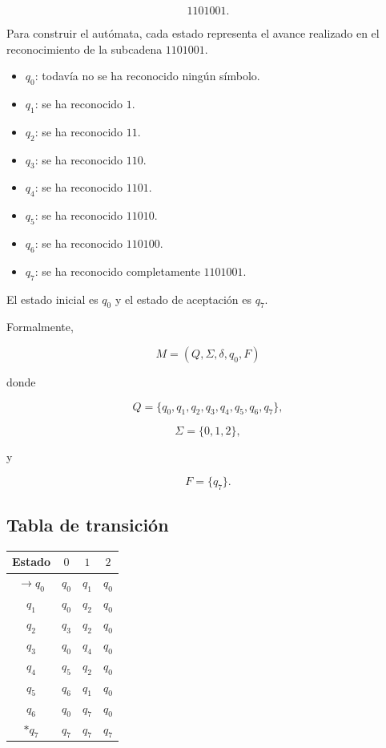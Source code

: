 \documentclass[12pt]{article}
\begin{document}
\[
1101001.
\]

Para construir el autómata, cada estado representa el avance realizado
en el reconocimiento de la subcadena $1101001$.

\begin{itemize}
    \item $q_0$: todavía no se ha reconocido ningún símbolo.
    \item $q_1$: se ha reconocido $1$.
    \item $q_2$: se ha reconocido $11$.
    \item $q_3$: se ha reconocido $110$.
    \item $q_4$: se ha reconocido $1101$.
    \item $q_5$: se ha reconocido $11010$.
    \item $q_6$: se ha reconocido $110100$.
    \item $q_7$: se ha reconocido completamente $1101001$.
\end{itemize}

El estado inicial es $q_0$ y el estado de aceptación es $q_7$.

Formalmente,

\[
M=(Q,\Sigma,\delta,q_0,F)
\]

donde

\[
Q=\{q_0,q_1,q_2,q_3,q_4,q_5,q_6,q_7\},
\]

\[
\Sigma=\{0,1,2\},
\]

y

\[
F=\{q_7\}.
\]

\subsection*{Tabla de transición}

\begin{center}
\begin{tabular}{c|ccc}
Estado & $0$ & $1$ & $2$ \\ \hline
$\rightarrow q_0$ & $q_0$ & $q_1$ & $q_0$ \\
$q_1$ & $q_0$ & $q_2$ & $q_0$ \\
$q_2$ & $q_3$ & $q_2$ & $q_0$ \\
$q_3$ & $q_0$ & $q_4$ & $q_0$ \\
$q_4$ & $q_5$ & $q_2$ & $q_0$ \\
$q_5$ & $q_6$ & $q_1$ & $q_0$ \\
$q_6$ & $q_0$ & $q_7$ & $q_0$ \\
$*q_7$ & $q_7$ & $q_7$ & $q_7$
\end{tabular}
\end{center}
\end{document}
